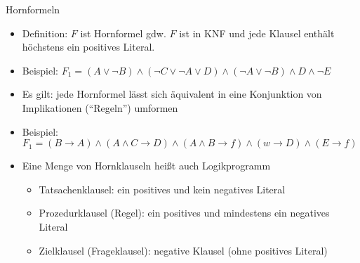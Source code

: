 \begin{frame}{Hornformeln}
	\begin{itemize}
		\item Definition: $F$ ist Hornformel gdw. $F$ ist in KNF und jede Klausel enthält höchstens ein positives Literal.
		\item Beispiel: $F_1=(A \lor \neg B) \land (\neg C \lor \neg A \lor D) \land (\neg A \lor \neg B) \land D \land \neg E$
		\item Es gilt: jede Hornformel lässt sich äquivalent in eine Konjunktion von Implikationen ("`Regeln"') umformen
		\item Beispiel: $F_1=(B \rightarrow A) \land (A \land C \rightarrow D) \land (A \land B \rightarrow f) \land (w \rightarrow D) \land (E \rightarrow f)$
		\item Eine Menge von Hornklauseln heißt auch Logikprogramm
		\begin{itemize}
			\item Tatsachenklausel: ein positives und kein negatives Literal
			\item Prozedurklausel (Regel): ein positives und mindestens ein negatives Literal
			\item Zielklausel (Frageklausel): negative Klausel (ohne positives Literal)
		\end{itemize}
	\end{itemize}
\end{frame}